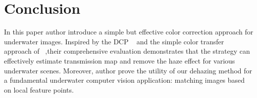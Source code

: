 \documentclass[10pt,twocolumn,letterpaper]{article}
\begin{document}
\section{Conclusion}
In this paper author introduce a simple but effective color correction approach for underwater images. Inspired by the DCP ~\cite{Single2009_2} and the simple color transfer approach of ~\cite{Color2001_3},their comprehensive evaluation demonstrates that the strategy can effectively estimate transmission map and remove the haze effect for various underwater scenes. Moreover, author prove the utility of our dehazing method for a fundamental underwater computer vision application: matching images based on local feature points.


{\small


}
\end{document}

